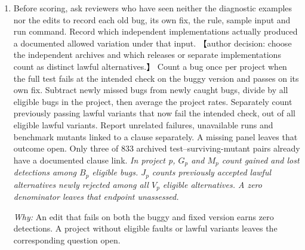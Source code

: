 \documentclass[10pt,a4paper]{article}
\begin{document}
\begin{enumerate}[leftmargin=*,start=5]
  \item Before scoring, ask reviewers who have seen neither the diagnostic examples nor the edits to record each old bug, its own fix, the rule, sample input and run command. Record which independent implementations actually produced a documented allowed variation under that input. 【author decision: choose the independent archives and which releases or separate implementations count as distinct lawful alternatives.】 Count a bug once per project when the full test fails at the intended check on the buggy version and passes on its own fix. Subtract newly missed bugs from newly caught bugs, divide by all eligible bugs in the project, then average the project rates. Separately count previously passing lawful variants that now fail the intended check, out of all eligible lawful variants. Report unrelated failures, unavailable runs and benchmark mutants linked to a clause separately. A missing panel leaves that outcome open. Only three of 833 archived test--surviving-mutant pairs already have a documented clause link.
\noindent\emph{In project p, \(G_{p}\) and \(M_{p}\) count gained and lost detections among \(B_{p}\) eligible bugs. \(J_{p}\) counts previously accepted lawful alternatives newly rejected among all \(V_{p}\) eligible alternatives. A zero denominator leaves that endpoint unassessed.}
\par{}
\par\emph{Why:} An edit that fails on both the buggy and fixed version earns zero detections. A project without eligible faults or lawful variants leaves the corresponding question open.
\end{enumerate}
\end{document}
